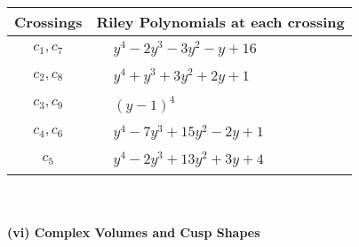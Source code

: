 \documentclass[1p]{elsarticle_modified}
\theoremstyle{definition}
\begin{document}
\begin{tabular}{m{50pt}|m{274pt}}
Crossings & \hspace{64pt}Riley Polynomials at each crossing \\
\hline $$\begin{aligned}c_{1},c_{7}\end{aligned}$$&$\begin{aligned}
&y^4-2 y^3-3 y^2- y+16
\end{aligned}$\\
\hline $$\begin{aligned}c_{2},c_{8}\end{aligned}$$&$\begin{aligned}
&y^4+y^3+3 y^2+2 y+1
\end{aligned}$\\
\hline $$\begin{aligned}c_{3},c_{9}\end{aligned}$$&$\begin{aligned}
&(y-1)^4
\end{aligned}$\\
\hline $$\begin{aligned}c_{4},c_{6}\end{aligned}$$&$\begin{aligned}
&y^4-7 y^3+15 y^2-2 y+1
\end{aligned}$\\
\hline $$\begin{aligned}c_{5}\end{aligned}$$&$\begin{aligned}
&y^4-2 y^3+13 y^2+3 y+4
\end{aligned}$\\
\hline
\end{tabular}\\~\\
\newpage\flushleft \textbf{(vi) Complex Volumes and Cusp Shapes}
\end{document}
